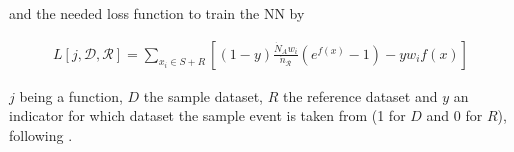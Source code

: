 \documentclass{article}
\begin{document}
and the needed loss function to train the NN by

$$
\begin{aligned}
    L[j, \mathcal{D}, \mathcal{R}] = \sum\limits_{x_i\in S + R}
    \left[
        (1 - y) \frac
            {\dot{N}_A w_i}
            {\dot{n}_{\mathcal{R}}} \left( e^{f(x)} - 1 \right) - y w_i f(x)
    \right]
\end{aligned}
$$

$j$ being a function, $D$ the sample dataset, $R$ the reference dataset and $y$ an indicator for which dataset the sample event is taken from (1 for $D$ and 0 for $R$), following \cite{Italian_no_1_Learning_New_Physics_from_a_Machine}.



\end{document}
